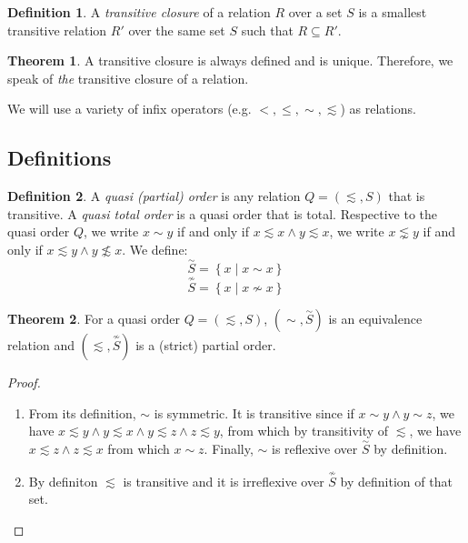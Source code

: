 \documentclass[12pt]{article}
\theoremstyle{definition}
\newtheorem{definition}{Definition}[section]
\theoremstyle{theorem}
\newtheorem{theorem}{Theorem}[section]
\def\aset#1{\left\{{#1}\right\}}
\begin{document}
\begin{definition}
    A \emph{transitive closure} of a relation $R$ over a set $S$ is a
    smallest transitive relation $R'$ over the same set $S$ such that
    $R \subseteq R'$.
\end{definition}
\begin{theorem}
  A transitive closure is always defined and is unique.  Therefore, we
  speak of \emph{the} transitive closure of a relation.
\end{theorem}

We will use a variety of infix operators (e.g. \( <, \leq, \sim, \lesssim \)) as relations. 

\subsection{Definitions}

\def\SimHat#1{\stackrel{\sim}{#1}}
\def\NotSimHat#1{\stackrel{\not\sim}{#1}}

\begin{definition}
  A \emph{quasi (partial) order} is any relation $Q=(\lesssim,S)$ that is transitive.
  A \emph{quasi total order} is a quasi order that is total.
  Respective to the quasi order $Q$, we write \( x \sim y \) if and only if \( x \lesssim x \wedge y \lesssim x \), we write \( x \lnsim y \) if and only if \( x \lesssim y \wedge y \not\lesssim x \).  We define:
  \[ \SimHat{S} = \aset{x \mid x \sim x} \]
  \[ \NotSimHat{S} = \aset{x \mid x \not\sim x } \]
\end{definition}
\begin{theorem}
  For a quasi order $Q=(\lesssim,S)$, \((\sim,\SimHat{S})\) is an equivalence relation and 
  \((\lesssim,\NotSimHat{S})\) is a (strict) partial order.
\end{theorem}
\begin{proof}
  
  \verb| |
  
  \begin{enumerate}
    \item
      From its definition, $\sim$ is symmetric.  It is transitive since if
      \( x \sim y \wedge y \sim z \), we have \( x \lesssim y \wedge y
      \lesssim x \wedge y \lesssim z \wedge z \lesssim y \), from which
      by transitivity of $\lesssim$, we have \( x \lesssim z \wedge z
      \lesssim x \) from which \( x \sim z \).  Finally, $\sim$ is
      reflexive over \(\SimHat{S}\) by definition.
    \item
      By definiton $\lesssim$ is transitive and it is irreflexive over
      $\NotSimHat{S}$ by definition of that set.
  \end{enumerate}
\end{proof}
\end{document}

